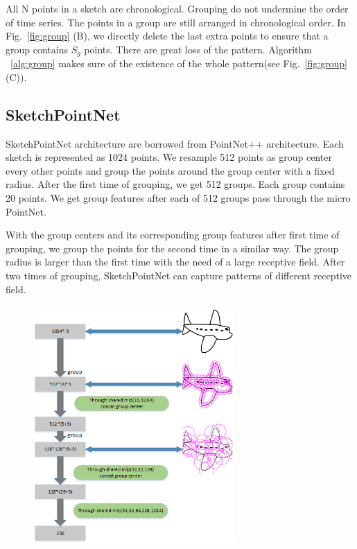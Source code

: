 All N points in a sketch are chronological. Grouping do not undermine the order of time series. The points in a group are still arranged in chronological order. In Fig.~\ref{fig:group} (B), we directly delete the last extra points to ensure that a group contains $S_g$ points. There are great loss of the pattern.  Algorithm ~\ref{alg:group} makes sure of the existence of the whole pattern(see Fig.~\ref{fig:group} (C)).

\subsection{SketchPointNet}
\label{ssec:sketch_point_net}

SketchPointNet architecture are borrowed from PointNet++ architecture. Each sketch is represented as 1024 points. We resample 512 points as group center every other points and group the points around the group center with a fixed radius. After the first time of grouping, we get 512 groups. Each group contains 20 points. We get group features after each of 512 groups pass through the micro PointNet.

With the group centers and its corresponding group features after first time of grouping, we group the points for the second time in a similar way. The group radius is larger than the first time with the need of a large receptive field. After two times of grouping, SketchPointNet can capture patterns of different receptive field.

\begin{figure}
    \center
    \includegraphics[width=3in]{images/sketchpointnet.png}
    \label{fig:sketchpointnet}
\end{figure}
